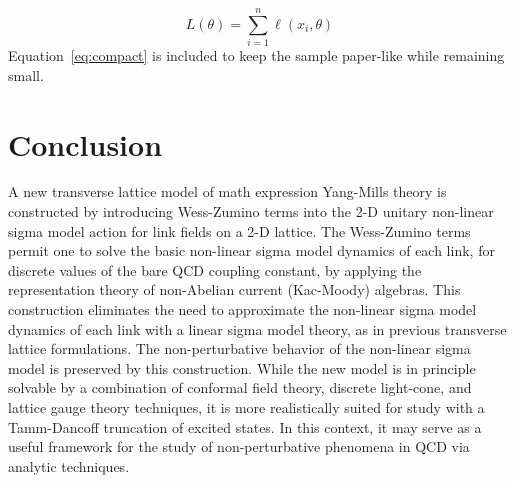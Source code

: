 \documentclass[11pt]{article}
\begin{document}
\begin{equation}
\label{eq:compact}
L(\theta) = \sum_{i=1}^{n} \ell(x_i, \theta)
\end{equation}
Equation~\ref{eq:compact} is included to keep the sample paper-like while remaining small.

\section{Conclusion}

A new transverse lattice model of math expression Yang-Mills theory is constructed by introducing Wess-Zumino terms into the 2-D unitary non-linear sigma model action for link fields on a 2-D lattice. The Wess-Zumino terms permit one to solve the basic non-linear sigma model dynamics of each link, for discrete values of the bare QCD coupling constant, by applying the representation theory of non-Abelian current (Kac-Moody) algebras. This construction eliminates the need to approximate the non-linear sigma model dynamics of each link with a linear sigma model theory, as in previous transverse lattice formulations. The non-perturbative behavior of the non-linear sigma model is preserved by this construction. While the new model is in principle solvable by a combination of conformal field theory, discrete light-cone, and lattice gauge theory techniques, it is more realistically suited for study with a Tamm-Dancoff truncation of excited states. In this context, it may serve as a useful framework for the study of non-perturbative phenomena in QCD via analytic techniques.
\end{document}
